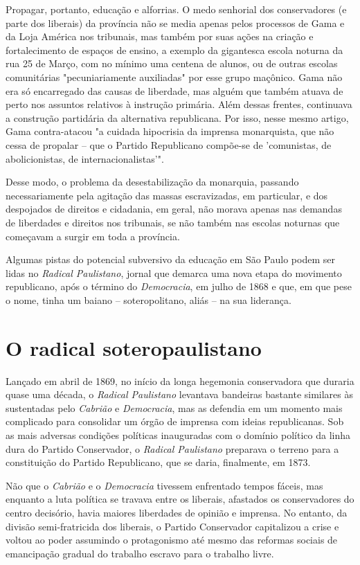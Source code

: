 Propagar, portanto, educação e alforrias. O medo senhorial dos
conservadores (e parte dos liberais) da província não se media apenas
pelos processos de Gama e da Loja América nos tribunais, mas também por
suas ações na criação e fortalecimento de espaços de ensino, a exemplo
da gigantesca escola noturna da rua 25 de Março, com no mínimo uma
centena de alunos, ou de outras escolas comunitárias "pecuniariamente
auxiliadas" por esse grupo maçônico. Gama não era só encarregado das
causas de liberdade, mas alguém que também atuava de perto nos assuntos
relativos à instrução primária. Além dessas frentes, continuava a
construção partidária da alternativa republicana. Por isso, nesse mesmo
artigo, Gama contra-atacou "a cuidada hipocrisia da imprensa
monarquista, que não cessa de propalar -- que o Partido Republicano
compõe-se de 'comunistas, de abolicionistas, de internacionalistas'".

Desse modo, o problema da desestabilização da monarquia, passando
necessariamente pela agitação das massas escravizadas, em particular, e
dos despojados de direitos e cidadania, em geral, não morava apenas nas
demandas de liberdades e direitos nos tribunais, se não também nas
escolas noturnas que começavam a surgir em toda a província.

Algumas pistas do potencial subversivo da educação em São Paulo podem
ser lidas no \emph{Radical Paulistano}, jornal que demarca uma nova
etapa do movimento republicano, após o término do \emph{Democracia}, em
julho de 1868 e que, em que pese o nome, tinha um baiano --
soteropolitano, aliás -- na sua liderança.

\section{O radical soteropaulistano}

Lançado em abril de 1869, no início da longa hegemonia conservadora que
duraria quase uma década, o \emph{Radical Paulistano} levantava
bandeiras bastante similares às sustentadas pelo \emph{Cabrião} e
\emph{Democracia}, mas as defendia em um momento mais complicado para
consolidar um órgão de imprensa com ideias republicanas. Sob as mais
adversas condições políticas inauguradas com o domínio político da linha
dura do Partido Conservador, o \emph{Radical Paulistano} preparava o
terreno para a constituição do Partido Republicano, que se daria,
finalmente, em 1873.

Não que o \emph{Cabrião} e o \emph{Democracia} tivessem enfrentado
tempos fáceis, mas enquanto a luta política se travava entre os
liberais, afastados os conservadores do centro decisório, havia maiores
liberdades de opinião e imprensa. No entanto, da divisão semi-fratricida
dos liberais, o Partido Conservador capitalizou a crise e voltou ao
poder assumindo o protagonismo até mesmo das reformas sociais de
emancipação gradual do trabalho escravo para o trabalho livre.

